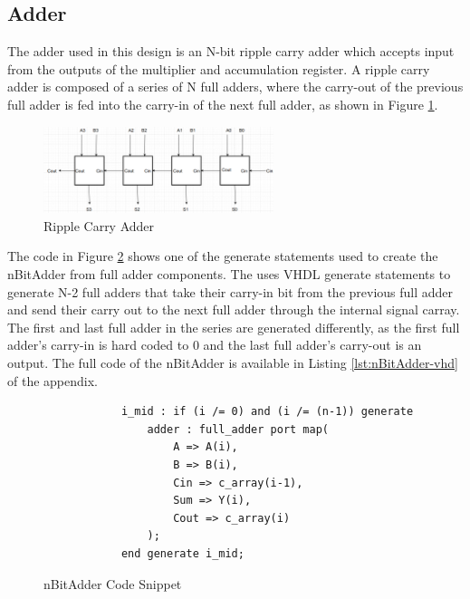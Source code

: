 \documentclass[11pt]{article}
\begin{document}
	\subsection{Adder}
	
		The adder used in this design is an N-bit ripple carry adder which accepts input from the outputs of the multiplier and accumulation register. A ripple carry adder is composed of a series of N full adders, where the carry-out of the previous full adder is fed into the carry-in of the next full adder, as shown in Figure \ref{fig:ripple-carry-adder}.
		
		\begin{figure}[H]
			\centering
			\includegraphics[width=0.6\textwidth,height=\dimexpr\textheight-4\baselineskip-\abovecaptionskip-\belowcaptionskip\relax,keepaspectratio]{"Pictures/Ripple Carry Adder"}
			\caption{Ripple Carry Adder}
			\label{fig:ripple-carry-adder}
		\end{figure}
		
		The code in Figure \ref{code:nBitAdder} shows one of the generate statements used to create the nBitAdder from full adder components. The uses VHDL generate statements to generate N-2 full adders that take their carry-in bit from the previous full adder and send their carry out to the next full adder through the internal signal carray. The first and last full adder in the series are generated differently, as the first full adder's carry-in is hard coded to 0 and the last full adder's carry-out is an output. The full code of the nBitAdder is available in Listing \ref{lst:nBitAdder-vhd} of the appendix.
		
		\begin{figure}[H]
		\centering
		\begin{verbatim}
            i_mid : if (i /= 0) and (i /= (n-1)) generate
                adder : full_adder port map(
                    A => A(i),
                    B => B(i),
                    Cin => c_array(i-1),
                    Sum => Y(i),
                    Cout => c_array(i)
                );
            end generate i_mid;
        \end{verbatim}
        \caption{nBitAdder Code Snippet} 
    	\label{code:nBitAdder} 
    	\end{figure}
	
\end{document}
